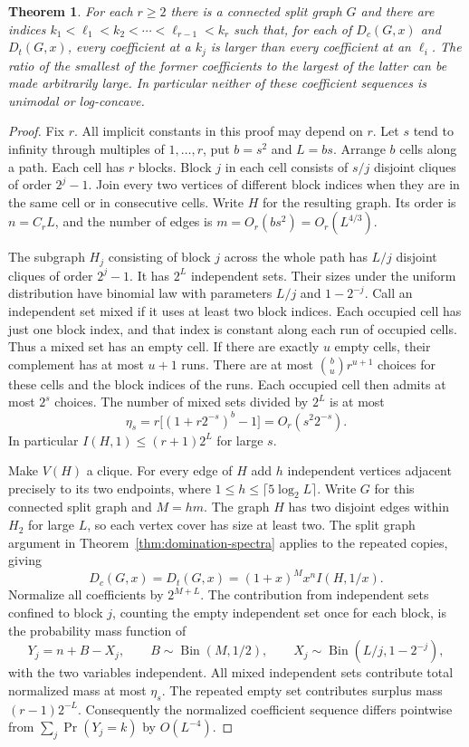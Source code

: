 \documentclass[11pt,a4paper]{article}
\newtheorem{theorem}{Theorem}[section]
\begin{document}
\begin{theorem}\label{thm:dom-peaks}
For each $r\ge2$ there is a connected split graph $G$ and there are indices
$k_1<\ell_1<k_2<\cdots<\ell_{r-1}<k_r$ such that, for each of
$D_c(G,x)$ and $D_t(G,x)$, every coefficient at a $k_j$ is
larger than every coefficient at an $\ell_i$. The ratio of the smallest
of the former coefficients to the largest of the latter can be made
arbitrarily large. In particular neither of these coefficient sequences
is unimodal or log-concave.
\end{theorem}

\begin{proof}
Fix $r$. All implicit constants in this proof may depend on $r$.
Let $s$ tend to infinity through multiples of $1,\ldots,r$, put
$b=s^2$ and $L=bs$. Arrange $b$ cells along a path. Each cell has
$r$ blocks. Block $j$ in each cell consists of $s/j$ disjoint cliques
of order $2^j-1$. Join every two vertices of different block indices
when they are in the same cell or in consecutive cells. Write $H$ for
the resulting graph. Its order is $n=C_r L$, and the number of edges
is $m=O_r(bs^2)=O_r(L^{4/3})$.

The subgraph $H_j$ consisting of block $j$ across the whole path has
$L/j$ disjoint cliques of order $2^j-1$. It has $2^L$ independent sets.
Their sizes under the uniform distribution have binomial law with
parameters $L/j$ and $1-2^{-j}$. Call an independent set mixed if it
uses at least two block indices. Each occupied cell has just one block
index, and that index is constant along each run of occupied cells.
Thus a mixed set has an empty cell. If there are exactly $u$ empty cells,
their complement has at most $u+1$ runs. There are at most
$\binom bu r^{u+1}$ choices for these cells and the block indices
of the runs. Each occupied cell then admits at most $2^s$ choices.
The number of mixed sets divided by $2^L$ is at most
\[
 \eta_s=r\big[(1+r2^{-s})^b-1\big]=O_r(s^2 2^{-s}).
\]
In particular $I(H,1)\le(r+1)2^L$ for large $s$.

Make $V(H)$ a clique. For every edge of $H$ add
$h$ independent vertices adjacent precisely to its
two endpoints, where $1\le h\le\lceil 5\log_2 L\rceil$. Write $G$ for
this connected split graph and $M=hm$.
The graph $H$ has two disjoint edges within $H_2$ for large $L$, so
each vertex cover has size at least two. The split graph argument in
Theorem~\ref{thm:domination-spectra} applies to the repeated copies,
giving
\[
 D_c(G,x)=D_t(G,x)=(1+x)^M x^n I(H,1/x).
\]
Normalize all coefficients by $2^{M+L}$. The contribution from
independent sets confined to block $j$, counting the empty independent
set once for each block, is the probability mass function of
\[
 Y_j=n+B-X_j,\qquad B\sim\operatorname{Bin}(M,1/2),\qquad
 X_j\sim\operatorname{Bin}(L/j,1-2^{-j}),
\]
with the two variables independent. All mixed independent sets
contribute total normalized mass at most $\eta_s$.
The repeated empty set contributes surplus mass $(r-1)2^{-L}$.
Consequently the normalized coefficient sequence differs
pointwise from $\sum_j\Pr(Y_j=k)$ by $O(L^{-4})$.


\end{proof}
\end{document}
